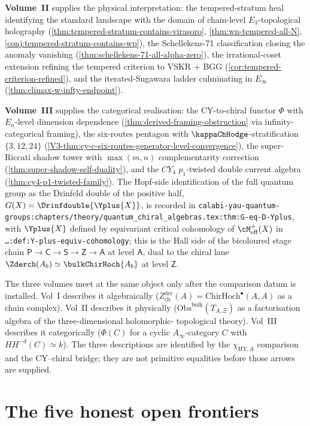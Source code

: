 \textbf{Volume~II} supplies the physical interpretation: the
tempered-stratum heal identifying the standard landscape with the
domain of chain-level $E_{3}$-topological holography
(\cref{thm:tempered-stratum-contains-virasoro},
\cref{thm:wn-tempered-all-N},
\cref{conj:tempered-stratum-contains-wp}), the Schellekens-71
classification closing the anomaly vanishing
(\cref{thm:schellekens-71-all-alpha-zero}), the irrational-coset
extension refining the tempered criterion to
VSKR + BGG (\cref{cor:tempered-criterion-refined}), and the
iterated-Sugawara ladder culminating in $E_{\infty}$
(\cref{thm:climax-w-infty-endpoint}).

\textbf{Volume~III} supplies the categorical realisation: the
CY-to-chiral functor $\Phi$ with $E_{n}$-level dimension
dependence (\cref{thm:derived-framing-obstruction} via
infinity-categorical framing), the six-routes pentagon with
$\kappaChHodge$-stratification $\{3, 12, 24\}$
(\cref{V3-thm:cy-c-six-routes-generator-level-convergence}), the
super-Riccati shadow tower with $\max(m, n)$ complementarity
correction
(\cref{thm:super-shadow-self-duality}), and the $CY_{4}$
$p_{1}$-twisted double current algebra
(\cref{thm:cy4-p1-twisted-family}).
The Hopf-side identification of the full quantum group as the
Drinfeld double of the positive half,
$G(X) = \Drinfdouble{\Yplus{X}}$, is recorded in
\texttt{calabi-yau-quantum-groups:chapters/theory/quantum\_chiral\_algebras.tex:thm:G-eq-D-Yplus},
with $\Yplus{X}$ defined by equivariant critical cohomology of
$\cM^+_{\mathrm{eff}}(X)$ in
\texttt{\ldots:def:Y-plus-equiv-cohomology}; this is the Hall side
of the bicoloured stage chain $\mathsf{P}\to\mathsf{C}\to
\mathsf{S}\to\mathsf{Z}\to\mathsf{A}$ at level $\mathsf{A}$, dual to
the chiral lane $\Zderch(A_b) \simeq \bulkChirHoch{A_b}$ at level
$\mathsf{Z}$.

The three volumes meet at the same object only after the comparison
datum is installed. Vol~I describes it
algebraically ($Z^{\mathrm{der}}_{\mathrm{ch}}(A) =
\mathrm{ChirHoch}^{\bullet}(A, A)$ as a chain complex). Vol~II
describes it physically
($\mathrm{Obs}^{\mathrm{bulk}}(T_{A,\Xi})$ as a
factorisation algebra of the three-dimensional holomorphic-
topological theory). Vol~III describes it categorically
($\Phi(C)$ for a cyclic $A_{\infty}$-category $C$ with
$H H^{-d}(C) \simeq k$). The three descriptions are identified by
the \(\chi_{\mathrm{HT},A}\) comparison and the CY--chiral bridge; they
are not primitive equalities before those arrows are supplied.

\section{The five honest open frontiers}
\label{sec:climax-open-frontiers}

